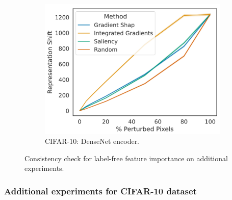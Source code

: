 \begin{figure}
\begin{subfigure}[b]{0.3\textwidth}
         \centering
         \includegraphics[width=\textwidth]{images/feature_consistency_dense.png}
         \caption{CIFAR-10: DenseNet encoder.}
         \label{fig:densenet_f_imp}
     \end{subfigure}
        \caption{Consistency check for label-free feature importance on additional experiments.}
        \label{fig:feat-importance-fashion-dense}
\end{figure}

\subsubsection{Additional experiments for CIFAR-10 dataset} 



